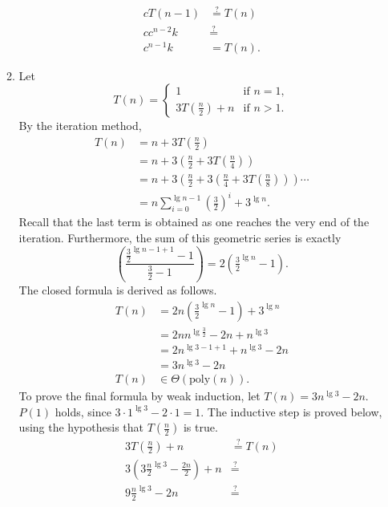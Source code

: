 \documentclass[12pt]{article}
\begin{document}
\begin{enumerate}
\begin{enumerate}
        \begin{align*}
            cT(n - 1) &\stackrel{?}{=} T(n) \\
            c c^{n - 2} k &\stackrel{?}{=} \\
            c^{n - 1} k &= T(n). 
        \end{align*}
        \item\label{ex:4d} Let \[
            T(n) = \begin{cases}
                1 &\text{if } n = 1, \\
                3T(\frac{n}{2}) + n &\text{if } n > 1.
            \end{cases}
        \] By the iteration method,
        \begin{align*}
            T(n) &= n + 3T(\tfrac{n}{2}) \\
            &= n + 3(\tfrac{n}{2} + 3T(\tfrac{n}{4})) \\ 
            &= n + 3(\tfrac{n}{2} + 3(\tfrac{n}{4} + 3T(\tfrac{n}{8}))) \cdots \\
            &= n\sum_{i = 0}^{\lg n - 1} (\tfrac{3}{2})^{i} + 3^{\lg n}.
        \end{align*}
        Recall that the last term is obtained as one reaches the very end of the iteration. Furthermore, the sum of this geometric series is exactly \[\left(\frac{\frac{3}{2}^{\lg n - 1+ 1} - 1}{\frac{3}{2} - 1}\right) = 2(\tfrac{3}{2}^{\lg n} - 1).\]
        The closed formula is derived as follows.
        \begin{align*}
            T(n) &= 2n(\tfrac{3}{2}^{\lg n} - 1) + 3^{\lg n} \\
            &= 2nn^{\lg \tfrac{3}{2}} - 2n + n^{\lg 3} \\
            &= 2n^{\lg 3 - 1 + 1} + n^{\lg 3} - 2n \\
            &= 3n^{\lg 3} - 2n \\
            T(n) &\in \Theta(\text{poly}(n)).
        \end{align*}
        To prove the final formula by weak induction, let $T(n) = 3n^{\lg 3} - 2n$. $P(1)$ holds, since $3 \cdot 1^{\lg 3} - 2 \cdot 1 = 1$. The inductive step is proved below, using the hypothesis that $T(\frac{n}{2})$ is true.
        \begin{align*}
            3T(\tfrac{n}{2}) + n &\stackrel{?}{=} T(n) \\
            3(3\tfrac{n}{2}^{\lg 3} - \tfrac{2n}{2}) + n &\stackrel{?}{=} \\
            9\tfrac{n}{2}^{\lg 3} - 2n &\stackrel{?}{=} \\

\end{align*}
\end{enumerate}
\end{enumerate}
\end{document}
